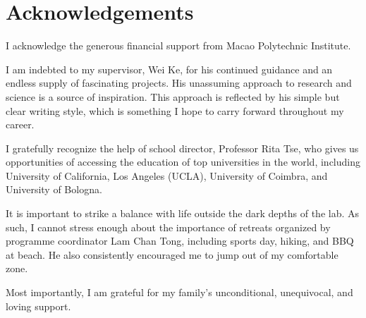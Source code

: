 \chapter{Acknowledgements}

I acknowledge the generous financial support from Macao Polytechnic Institute.

I am indebted to my supervisor, Wei Ke, for his continued guidance and an endless supply of fascinating projects. His unassuming approach to research and science is a source of inspiration. This approach is reflected by his simple but clear writing style, which is something I hope to carry forward throughout my career.

I gratefully recognize the help of school director, Professor Rita Tse, who gives us opportunities of accessing the education of top universities in the world, including University of California, Los Angeles (UCLA), University of Coimbra, and University of Bologna.


It is important to strike a balance with life outside the dark depths of the lab. As such, I cannot stress enough about the importance of retreats organized by programme coordinator Lam Chan Tong, including sports day, hiking, and BBQ at beach. He also consistently encouraged me to jump out of my comfortable zone.



Most importantly, I am grateful for my family's unconditional, unequivocal, and loving support.